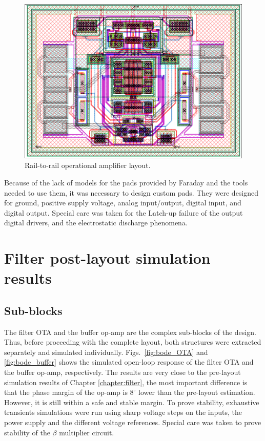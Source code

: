 \begin{figure}[!t]
	\centering
	\includegraphics[width=4.5in]{./Figures/buffer_layout}
	\caption{Rail-to-rail operational amplifier layout.}\label{fig:buffer_layout}
\end{figure}

Because of the lack of models for the pads provided by Faraday and the tools needed to use them, it was necessary to design custom pads. They were designed for ground, positive supply voltage, analog input/output, digital input, and digital output. Special care was taken for the Latch-up failure of the output digital drivers, and the electrostatic discharge phenomena. 

\section{Filter post-layout simulation results}
\subsection{Sub-blocks}
The filter OTA and the buffer op-amp are the complex sub-blocks of the design. Thus, before proceeding with the complete layout, both structures were extracted separately and simulated individually. Figs.~\ref{fig:bode_OTA} and \ref{fig:bode_buffer}  shows the simulated open-loop response of the filter OTA and the buffer op-amp, respectively. The results are very close to the \mbox{pre-layout} simulation results of Chapter \ref{chapter:filter}, the most important difference is that the phase margin of the \mbox{op-amp} is $8^\circ$ lower than the pre-layout estimation. However, it is still within a safe and stable margin. To prove stability, exhaustive transients simulations were run using sharp voltage steps on the inputs, the power supply and the different voltage references. Special care was taken to prove stability of the $\beta$ multiplier circuit.

